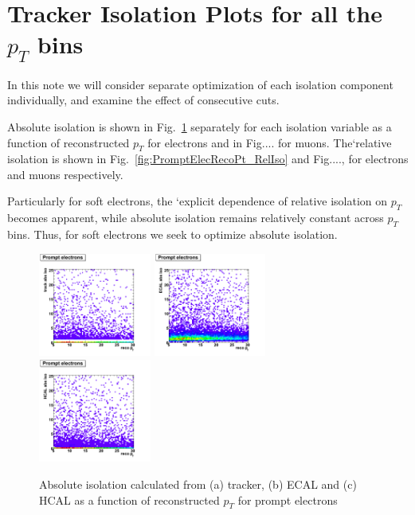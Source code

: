 \section{Tracker Isolation Plots for all the $p_T$ bins}


In this note we will consider separate optimization of each isolation component individually, and
examine the effect of consecutive cuts.

Absolute isolation is shown in
Fig.~\ref{fig:PromptElecRecoPt_AbsIso} separately for each isolation variable as a function
of reconstructed $p_T$ for electrons and in Fig.... for muons. The`relative
isolation is shown in Fig.~\ref{fig:PromptElecRecoPt_RelIso} and Fig...., for electrons and
muons respectively.

 Particularly for soft electrons, the
 `explicit dependence of relative isolation on $p_T$ becomes apparent, while absolute isolation
 remains relatively constant across $p_T$ bins. Thus, for soft electrons we seek to optimize absolute
 isolation.

 \begin{figure}[htbp]
    \includegraphics[width = 0.33\textwidth]{pictures/recoPt_absIso/trackIso_elec_prompt.png}
    \includegraphics[width = 0.33\textwidth]{pictures/recoPt_absIso/ecalIso_elec_prompt.png}
    \includegraphics[width = 0.33\textwidth]{pictures/recoPt_absIso/hcalIso_elec_prompt.png}
    \caption{Absolute isolation calculated from (a) tracker, (b) ECAL and (c) HCAL as a function
       of reconstructed $p_{T}$ for prompt electrons}
    \label{fig:PromptElecRecoPt_AbsIso}
 \end{figure}

